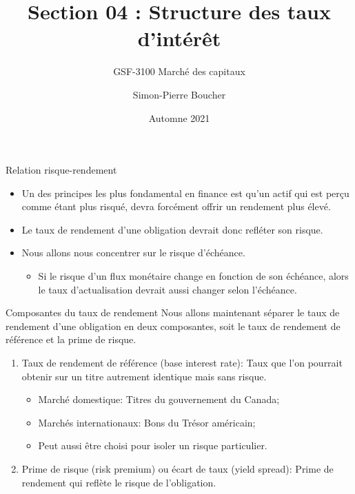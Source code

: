 \documentclass{beamer}
\title[S04 Taux d'intérêt]{Section 04 : Structure des taux d’intérêt}
\subtitle{GSF-3100 Marché des capitaux}
\author[SP. Boucher]{Simon-Pierre Boucher\inst{1}}
\institute[Université Laval]
{
  \inst{1}%
  Département de finance, assurance et immobilier\\
  Faculté des sciences de l'administration\\
  Université Laval}
\date[Automne 2021]{Automne 2021}
\begin{document}
\begin{frame}
\titlepage
\end{frame}

\begin{frame}{Relation risque-rendement}
\begin{itemize}
\item Un des principes les plus fondamental en finance est qu'un actif qui est perçu comme étant plus risqué,  devra forcément offrir un rendement plus élevé. 
\item Le taux de rendement d’une obligation devrait donc refléter son risque. 
\item Nous allons nous concentrer sur le risque d'échéance.
\begin{itemize}
\item Si le risque d’un flux monétaire change en fonction de son échéance,  alors le taux d’actualisation devrait aussi changer selon l’échéance.
\end{itemize}
\end{itemize}
\end{frame}
\begin{frame}{Composantes du taux de rendement}
Nous allons maintenant séparer le taux de rendement d'une obligation en deux composantes,  soit le taux de rendement de référence et la prime de risque.

\begin{enumerate}
\item Taux de rendement de référence (base interest rate): Taux que l’on pourrait obtenir sur un titre autrement identique mais sans risque.
\begin{itemize}
\item Marché domestique: Titres du gouvernement du Canada;
\item Marchés internationaux: Bons du Trésor américain;
\item Peut aussi être choisi pour isoler un risque particulier.
\end{itemize}
\item Prime de risque (risk premium) ou écart de taux (yield spread): Prime de rendement qui reflète le risque de l’obligation.
\end{enumerate}
\end{frame}
\end{document}
